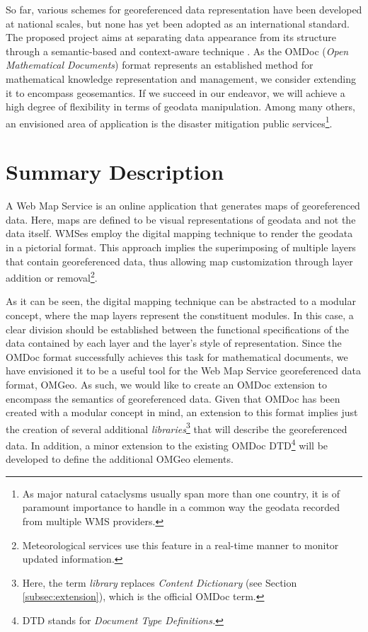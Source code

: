 \documentclass[a4paper,11pt,openany,notitlepage]{article}
\begin{document}
So far, various schemes for georeferenced data representation have been developed at national scales, but none has yet been adopted as an international standard. The proposed project aims at separating data appearance from its structure through a semantic-based and context-aware technique \cite{mkm2005}. As the OMDoc (\textit{Open Mathematical Documents}) format \cite{kohlhase2004} represents an established method for mathematical knowledge representation and management, we consider extending it to encompass geosemantics. If we succeed in our endeavor, we will achieve a high degree of flexibility in terms of geodata manipulation. Among many others, an envisioned area of application is the disaster mitigation public services\footnote{As major natural cataclysms usually span more than one country, it is of paramount importance to handle in a common way the geodata recorded from multiple WMS providers.}.

%
\section{Summary Description} \label{sec:summarydescr}
\indent

A Web Map Service is an online application that generates maps of georeferenced data. Here, maps are defined to be visual representations of geodata and not the data itself. WMSes employ the digital mapping technique \cite{ogc} to render the geodata in a pictorial format. This approach implies the superimposing of multiple layers that contain georeferenced data, thus allowing map customization through layer addition or removal\footnote{Meteorological services use this feature in a real-time manner to monitor updated information.}.

As it can be seen, the digital mapping technique can be abstracted to a modular concept, where the map layers represent the constituent modules. In this case, a clear division should be established between the functional specifications of the data contained by each layer and the layer's style of representation. Since the OMDoc format successfully achieves this task for mathematical documents, we have envisioned it to be a useful tool for the Web Map Service georeferenced data format, OMGeo. As such, we would like to create an OMDoc extension to encompass the semantics of georeferenced data. Given that OMDoc has been created with a modular concept in mind, an extension to this format implies just the creation of several additional \textit{libraries}\footnote{Here, the term \textit{library} replaces \textit{Content Dictionary} (see Section \ref{subsec:extension}), which is the official OMDoc term.} that will describe the georeferenced data. In addition, a minor extension to the existing OMDoc DTD\footnote{DTD stands for \textit{Document Type Definitions.}} \cite{kohlhasedtd} will be developed to define the additional OMGeo elements.
\end{document}

